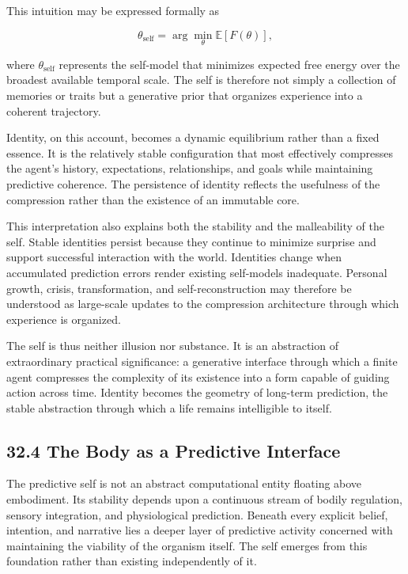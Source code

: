 \documentclass[12pt,letterpaper]{article}
\theoremstyle{remark}
\begin{document}
This intuition may be expressed formally as

\[
\theta_{\text{self}} = \arg\min_{\theta} \mathbb{E}[F(\theta)],
\]

where $\theta_{\text{self}}$ represents the self-model that minimizes expected free energy over the broadest available temporal scale. The self is therefore not simply a collection of memories or traits but a generative prior that organizes experience into a coherent trajectory.

Identity, on this account, becomes a dynamic equilibrium rather than a fixed essence. It is the relatively stable configuration that most effectively compresses the agent's history, expectations, relationships, and goals while maintaining predictive coherence. The persistence of identity reflects the usefulness of the compression rather than the existence of an immutable core.

This interpretation also explains both the stability and the malleability of the self. Stable identities persist because they continue to minimize surprise and support successful interaction with the world. Identities change when accumulated prediction errors render existing self-models inadequate. Personal growth, crisis, transformation, and self-reconstruction may therefore be understood as large-scale updates to the compression architecture through which experience is organized.

The self is thus neither illusion nor substance. It is an abstraction of extraordinary practical significance: a generative interface through which a finite agent compresses the complexity of its existence into a form capable of guiding action across time. Identity becomes the geometry of long-term prediction, the stable abstraction through which a life remains intelligible to itself.

\subsection{32.4 The Body as a Predictive Interface}

The predictive self is not an abstract computational entity floating above embodiment. Its stability depends upon a continuous stream of bodily regulation, sensory integration, and physiological prediction. Beneath every explicit belief, intention, and narrative lies a deeper layer of predictive activity concerned with maintaining the viability of the organism itself. The self emerges from this foundation rather than existing independently of it.
\end{document}
